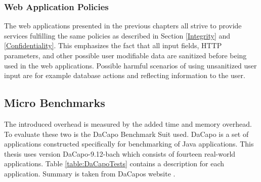 \subsubsection{Web Application Policies}
The web applications presented in the previous chapters all strive to provide services fulfilling the same policies as described in Section \ref{Integrity} and \ref{Confidentiality}. This emphasizes the fact that all input fields, HTTP parameters, and other possible user modifiable data are sanitized before being used in the web applications. Possible harmful scenarios of using unsanitized user input are for example database actions and reflecting information to the user.



\subsection{Micro Benchmarks}
The introduced overhead is measured by the added time and memory overhead. To evaluate these two is the DaCapo Benchmark Suit \parencite{dacapo} used. DaCapo is a set of applications constructed specifically for benchmarking of Java applications. This thesis uses version DaCapo-9.12-bach which consists of fourteen real-world applications. Table \ref{table:DaCapoTests} contains a description for each application. Summary is taken from DaCapos website \parencite{dacapoBench}.

